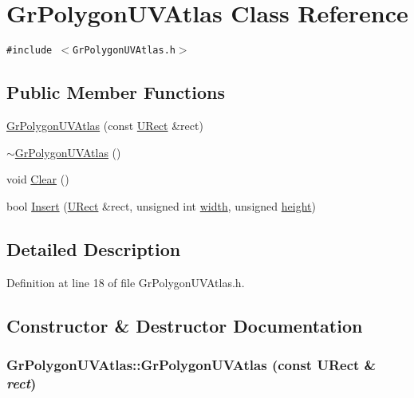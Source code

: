 \hypertarget{class_gr_polygon_u_v_atlas}{
\section{GrPolygonUVAtlas Class Reference}
\label{class_gr_polygon_u_v_atlas}
}
{\tt \#include $<$GrPolygonUVAtlas.h$>$}

\subsection*{Public Member Functions}
\begin{CompactItemize}
\item 
\hyperlink{class_gr_polygon_u_v_atlas_e3f1e84063089f27d98cc932cce810ee}{GrPolygonUVAtlas} (const \hyperlink{class_u_rect}{URect} \&rect)
\item 
\hyperlink{class_gr_polygon_u_v_atlas_e1cf21d5b675d7c589b9a2b46a7bd6a1}{$\sim$GrPolygonUVAtlas} ()
\item 
void \hyperlink{class_gr_polygon_u_v_atlas_62580d706b7506a2a71adbe408f94474}{Clear} ()
\item 
bool \hyperlink{class_gr_polygon_u_v_atlas_b62ec49b06ce84c6d400bcb129f48995}{Insert} (\hyperlink{class_u_rect}{URect} \&rect, unsigned int \hyperlink{wglext_8h_e6531b1788ca42a9ae8155b0c52e7630}{width}, unsigned \hyperlink{wglext_8h_b2e63df950c3789599e1e43f477bc9e3}{height})
\end{CompactItemize}


\subsection{Detailed Description}


Definition at line 18 of file GrPolygonUVAtlas.h.

\subsection{Constructor \& Destructor Documentation}
\hypertarget{class_gr_polygon_u_v_atlas_e3f1e84063089f27d98cc932cce810ee}{
\subsubsection[{GrPolygonUVAtlas}]{\setlength{\rightskip}{0pt plus 5cm}GrPolygonUVAtlas::GrPolygonUVAtlas (const {\bf URect} \& {\em rect})}}
\label{class_gr_polygon_u_v_atlas_e3f1e84063089f27d98cc932cce810ee}




